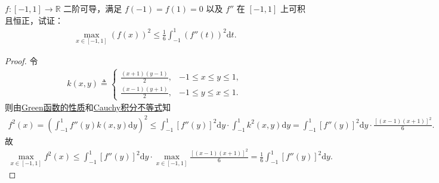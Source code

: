 \documentclass[../../main.tex]{subfiles}%
\begin{document}
\begin{example}
$f:[-1,1]\to\mathbb{R}$ 二阶可导，满足 $f(-1)=f(1)=0$ 以及 $f''$ 在 $[-1,1]$ 上可积且恒正，试证：
\begin{align*}
\max\limits_{x\in[-1,1]} (f(x))^2 \leqslant \frac{1}{6}\int_{-1}^{1} (f''(t))^2\mathrm{d}t.
\end{align*}
\end{example}

\begin{proof}
令
\begin{align*}
k\left( x,y \right) \triangleq
\begin{cases}
\frac{\left( x+1 \right) \left( y-1 \right)}{2}, & -1\leqslant x\leqslant y\leqslant 1,\\
\frac{\left( x-1 \right) \left( y+1 \right)}{2}, & -1\leqslant y\leqslant x\leqslant 1.
\end{cases}
\end{align*}
则由\hyperref[theorem:Green函数的性质]{Green函数的性质}和\hyperref[theorem:Cauchy积分不等式]{Cauchy积分不等式}知
\begin{align*}
f^2\left( x \right) =\left( \int_{-1}^1 f'' \left( y \right) k\left( x,y \right) \mathrm{d}y \right) ^2
\leqslant \int_{-1}^1 \left[ f'' \left( y \right) \right] ^2\mathrm{d}y \cdot \int_{-1}^1 k^2\left( x,y \right) \mathrm{d}y
= \int_{-1}^1 \left[ f'' \left( y \right) \right] ^2\mathrm{d}y \cdot \frac{\left[ \left( x-1 \right) \left( x+1 \right) \right] ^2}{6}.
\end{align*}
故
\begin{align*}
\max\limits_{x\in \left[ -1,1 \right]}f^2\left( x \right)
\leqslant \int_{-1}^1 \left[ f'' \left( y \right) \right] ^2\mathrm{d}y \cdot \max\limits_{x\in \left[ -1,1 \right]}\frac{\left[ \left( x-1 \right) \left( x+1 \right) \right] ^2}{6}
= \frac{1}{6}\int_{-1}^1 \left[ f'' \left( y \right) \right] ^2\mathrm{d}y.
\end{align*}
\end{proof}
\end{document}
